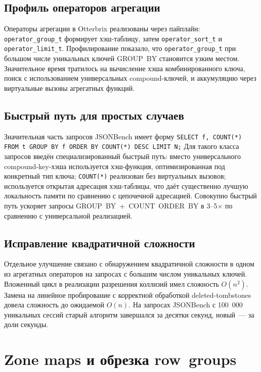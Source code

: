 \subsection{Профиль операторов агрегации}

Операторы агрегации в Otterbrix реализованы через пайплайн:
\texttt{operator\_group\_t} формирует хэш-таблицу, затем
\texttt{operator\_sort\_t} и \texttt{operator\_limit\_t}.
Профилирование показало, что \texttt{operator\_group\_t} при большом
числе уникальных ключей GROUP~BY становится узким местом.
Значительное время тратилось на вычисление хэша комбинированного
ключа, поиск с использованием универсальных compound-ключей, и
аккумуляцию через виртуальные вызовы агрегатных функций.

\subsection{Быстрый путь для простых случаев}

Значительная часть запросов JSONBench имеет форму
\texttt{SELECT f, COUNT(*) FROM t GROUP BY f ORDER BY COUNT(*) DESC LIMIT N;}
Для такого класса запросов введён специализированный быстрый путь:
вместо универсального compound-key-хэша используется хэш-функция,
оптимизированная под конкретный тип ключа; \texttt{COUNT(*)}
реализован без виртуальных вызовов; используется открытая адресация
хэш-таблицы, что даёт существенно лучшую локальность памяти по
сравнению с цепочечной адресацией. Совокупно быстрый путь ускоряет
запросы GROUP~BY~+~COUNT~ORDER~BY в 3--5$\times$ по сравнению с
универсальной реализацией.

\subsection{Исправление квадратичной сложности}

Отдельное улучшение связано с обнаружением квадратичной сложности в
одном из агрегатных операторов на запросах с большим числом
уникальных ключей. Вложенный цикл в реализации разрешения коллизий
имел сложность $O(n^2)$. Замена на линейное пробирование с
корректной обработкой deleted-tombstones довела сложность до
ожидаемой $O(n)$. На запросах JSONBench с 100~000 уникальных сессий
старый алгоритм завершался за десятки секунд, новый~--- за доли
секунды.

\section{Zone maps и обрезка row~groups}


